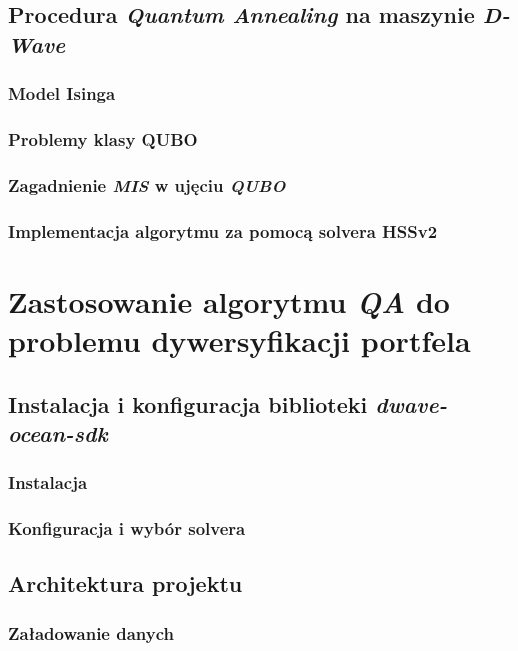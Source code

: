 \documentclass[12pt,a4paper,twoside,openany]{book}
\begin{document}
\section{Procedura \textit{Quantum Annealing} na maszynie \textit{D-Wave}}

\subsection{Model Isinga}

\subsection{Problemy klasy QUBO}

\subsection{Zagadnienie \textit{MIS} w ujęciu \textit{QUBO}}

\subsection{Implementacja algorytmu za pomocą solvera HSSv2}




\chapter{Zastosowanie algorytmu \textit{QA} do problemu dywersyfikacji portfela}

\section{Instalacja i konfiguracja biblioteki \textit{dwave-ocean-sdk}}
\subsection{Instalacja}

\subsection{Konfiguracja i wybór solvera}

\section{Architektura projektu}

\subsection{Załadowanie danych}
\end{document}

